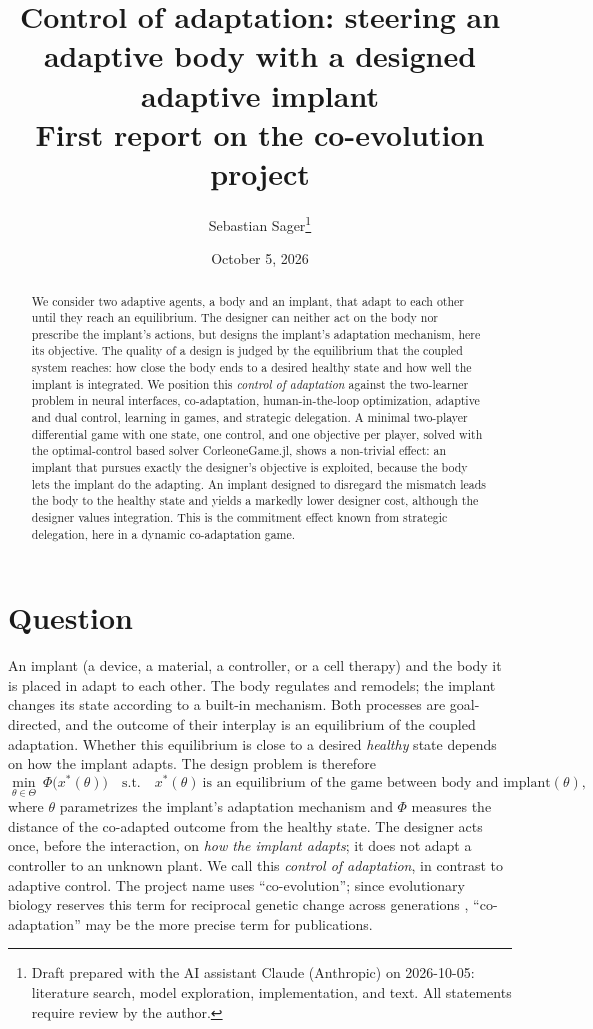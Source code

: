\documentclass[11pt,a4paper]{article}
\title{Control of adaptation: steering an adaptive body with a designed adaptive implant\\[0.3em]
\large First report on the co-evolution project}
\author{Sebastian Sager\thanks{Draft prepared with the AI assistant Claude (Anthropic) on
2026-10-05: literature search, model exploration, implementation, and text. All
statements require review by the author.}}
\date{October 5, 2026}
\begin{document}
\maketitle

\begin{abstract}
We consider two adaptive agents, a body and an implant, that adapt to each other until
they reach an equilibrium. The designer can neither act on the body nor prescribe the
implant's actions, but designs the implant's adaptation mechanism, here its objective.
The quality of a design is judged by the equilibrium that the coupled system reaches:
how close the body ends to a desired healthy state and how well the implant is
integrated. We position this \emph{control of adaptation} against the two-learner problem
in neural interfaces, co-adaptation, human-in-the-loop optimization, adaptive and dual
control, learning in games, and strategic delegation. A minimal two-player differential
game with one state, one control, and one objective per player, solved with the
optimal-control based solver CorleoneGame.jl, shows a non-trivial effect: an implant
that pursues exactly the designer's objective is exploited, because the body lets the
implant do the adapting. An implant designed to disregard the mismatch leads the body to
the healthy state and yields a markedly lower designer cost, although the designer
values integration. This is the commitment effect known from strategic delegation,
here in a dynamic co-adaptation game.
\end{abstract}

\section{Question}
An implant (a device, a material, a controller, or a cell therapy) and the body it is
placed in adapt to each other. The body regulates and remodels; the implant changes its
state according to a built-in mechanism. Both processes are goal-directed, and the
outcome of their interplay is an equilibrium of the coupled adaptation. Whether this
equilibrium is close to a desired \emph{healthy} state depends on how the implant adapts.
The design problem is therefore
\begin{equation}\label{eq:design}
\min_{\theta\in\Theta}\ \Phi\bigl(x^\ast(\theta)\bigr)\quad\text{s.t.}\quad
x^\ast(\theta)\ \text{is an equilibrium of the game between body and implant}(\theta),
\end{equation}
where $\theta$ parametrizes the implant's adaptation mechanism and $\Phi$ measures the
distance of the co-adapted outcome from the healthy state. The designer acts once, before
the interaction, on \emph{how the implant adapts}; it does not adapt a controller to an
unknown plant. We call this \emph{control of adaptation}, in contrast to adaptive control.
The project name uses ``co-evolution''; since evolutionary biology reserves this term for
reciprocal genetic change across generations \citep{DieckmannLaw1996}, ``co-adaptation''
may be the more precise term for publications.
\end{document}
